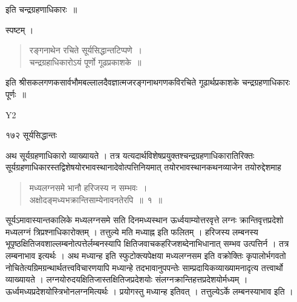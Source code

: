 \documentclass[11pt, openany]{book}
\begin{document}
{\setlength{\parindent}{5em}
 इति चन्द्रग्रहणाधिकारः~॥
}

स्पष्टम् ।


\begin{quote}
{\qt रङ्गनाथेन रचिते सूर्यसिद्धान्तटिप्पणे~।\\
चन्द्रग्रहाधिकारोऽयं पूर्णो गूढप्रकाशके~॥}
\end{quote}


इति श्रीसकलगणकसार्वभौमबल्लालदैवज्ञात्मजरङ्गनाथगणकविरचिते गूढार्थप्रकाशके चन्द्रग्रहणाधिकारः पूर्णः~॥

 

{\tiny{Y2}}

\newpage





\noindent १७२ \hspace{4cm} सूर्यसिद्धान्तः 
\vspace{1cm}

\begin{sloppypar}
 अथ सूर्यग्रहणाधिकारो व्याख्यायते । तत्र यत्यदार्थविशेषप्रयुक्तश्चन्द्रग्रहणाधिकारातिरिक्तः सूर्यग्रहणाधिकारस्तद्विशेषयोरभावस्थानादेवोत्पत्तिनियमात् तयोरभावस्थानकथनव्याजेन तयोरुद्देशमाह\textendash
\end{sloppypar}


\begin{quote}
  {\ssi मध्यलग्नसमे भानौ हरिजस्य न सम्भवः~।\\
अक्षोदङ्मध्यभक्रान्तिसाम्येनावनतेरपि~॥~१~॥}
\end{quote}

\begin{sloppypar}
 सूर्यऽमावास्यान्तकालिके मध्यलग्नसमे सति दिनमध्यस्थान ऊर्ध्वयाम्योत्तरवृत्ते लग्नः क्रान्तिवृत्तप्रदेशो मध्यलग्नं त्रिप्रश्नाधिकारोक्तम् । तत्तुल्ये मति मध्याह्न इति फलितम् । हरिजस्य लम्बनस्य भूपृष्ठक्षितिजवशाल्लम्बनोत्पत्तेर्लम्बनस्यापि क्षितिजवाचकहरिजशब्देनाभिधानात् सम्भव उत्पत्तिर्न । तत्र लम्बनाभाव इत्यर्थः । अथ मध्यान्ह इति स्फुटोक्त्यपेक्षया मध्यलग्नसम इति वक्रोक्तिः कृपालोर्भगवतो नोचितेत्यग्रिमग्रन्थार्थतत्त्वविचारणयापि मध्यान्हे तदभावानुपपन्तेः साम्प्रदायिकव्याख्यामनादृत्य तत्त्वार्थो व्याख्यायते । लग्नयोरुदयक्षितिजास्तक्षितिजप्रदेशयोः संलग्नक्रान्तिहत्तप्रदेशयोर्मध्यम् । ऊर्ध्वमध्यप्रदेशयोस्त्रिभोनलग्नमित्यर्थः । प्रयोगस्तु मध्यान्ह इतिवत् । तत्तुल्येऽर्के लम्बनस्याभाव इति ।
\end{sloppypar}
\end{document}
